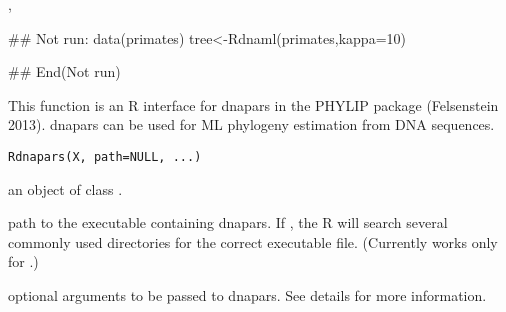 \documentclass[a4paper]{book}
\begin{document}
%
\begin{SeeAlso}\relax
{}, 
\end{SeeAlso}
%
\begin{Examples}
\begin{ExampleCode}
## Not run: 
data(primates)
tree<-Rdnaml(primates,kappa=10)

## End(Not run)
\end{ExampleCode}
\end{Examples}
%
\begin{Description}\relax
This function is an R interface for dnapars in the PHYLIP package (Felsenstein 2013). dnapars can be used for ML phylogeny estimation from DNA sequences.
\end{Description}
%
\begin{Usage}
\begin{verbatim}
Rdnapars(X, path=NULL, ...)
\end{verbatim}
\end{Usage}
%
\begin{Arguments}
\begin{ldescription}
\item[\code{X}] an object of class .
\item[\code{path}] path to the executable containing dnapars. If , the R will search several commonly used directories for the correct executable file. (Currently works only for .)
\item[\code{...}] optional arguments to be passed to dnapars. See details for more information.
\end{ldescription}
\end{Arguments}
%
\end{document}
